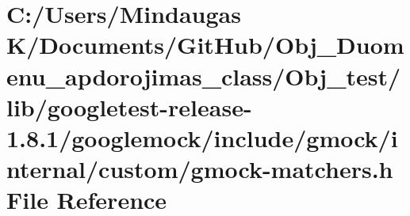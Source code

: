 \hypertarget{_obj__test_2lib_2googletest-release-1_88_81_2googlemock_2include_2gmock_2internal_2custom_2gmock-matchers_8h}{}\section{C\+:/\+Users/\+Mindaugas K/\+Documents/\+Git\+Hub/\+Obj\+\_\+\+Duomenu\+\_\+apdorojimas\+\_\+class/\+Obj\+\_\+test/lib/googletest-\/release-\/1.8.1/googlemock/include/gmock/internal/custom/gmock-\/matchers.h File Reference}
\label{_obj__test_2lib_2googletest-release-1_88_81_2googlemock_2include_2gmock_2internal_2custom_2gmock-matchers_8h}
